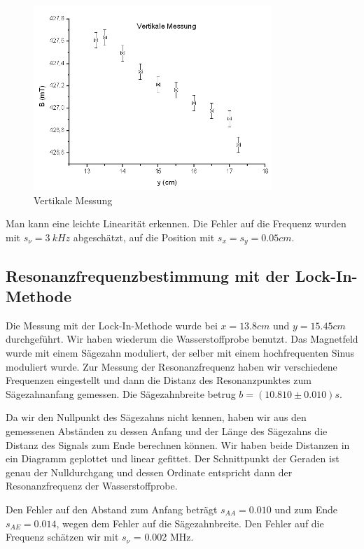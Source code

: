 \begin{figure}[H]
\centering \includegraphics[width=0.8\textwidth]{Bilder/homvert.png}
\caption{Vertikale Messung}
\end{figure}

Man kann eine leichte Linearität erkennen. Die Fehler auf die Frequenz wurden mit $s_\nu=3\ kHz$ abgeschätzt, auf die Position mit $s_x=s_y=0.05cm$.

\subsection{Resonanzfrequenzbestimmung mit der Lock-In-Methode}

Die Messung mit der Lock-In-Methode wurde bei $x=13.8cm$ und $y=15.45cm$ durchgeführt. Wir haben wiederum die Wasserstoffprobe benutzt. Das Magnetfeld wurde mit einem Sägezahn moduliert, der selber mit einem hochfrequenten Sinus moduliert wurde. Zur Messung der Resonanzfrequenz haben wir verschiedene Frequenzen eingestellt und dann die Distanz des Resonanzpunktes zum Sägezahnanfang gemessen. Die Sägezahnbreite betrug $b = (10.810 \pm 0.010)s$. 

Da wir den Nullpunkt des Sägezahns nicht kennen, haben wir aus den gemessenen Abständen zu dessen Anfang und der Länge des Sägezahns die Distanz des Signals zum Ende berechnen können. Wir haben beide Distanzen in ein Diagramm geplottet und linear gefittet. Der Schnittpunkt der Geraden ist genau der Nulldurchgang und dessen Ordinate entspricht dann der Resonanzfrequenz der Wasserstoffprobe.

Den Fehler auf den Abstand zum Anfang beträgt $s_{AA}=0.010$ und zum Ende $s_{AE}=0.014$, wegen dem Fehler auf die Sägezahnbreite. Den Fehler auf die Frequenz schätzen wir mit $s_\nu$ = 0.002 MHz.

